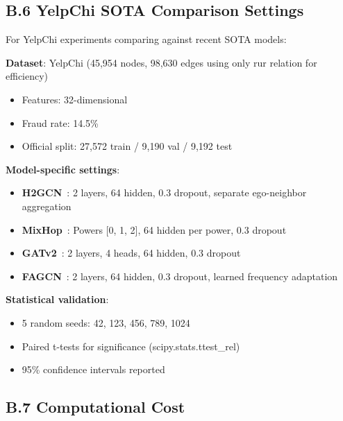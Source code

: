 \subsection*{B.6 YelpChi SOTA Comparison Settings}

For YelpChi experiments comparing against recent SOTA models:

\textbf{Dataset}: YelpChi (45,954 nodes, 98,630 edges using only rur relation for efficiency)
\begin{itemize}
\item Features: 32-dimensional
\item Fraud rate: 14.5\%
\item Official split: 27,572 train / 9,190 val / 9,192 test
\end{itemize}

\textbf{Model-specific settings}:
\begin{itemize}
\item \textbf{H2GCN}~\cite{zhu2020beyond}: 2 layers, 64 hidden, 0.3 dropout, separate ego-neighbor aggregation
\item \textbf{MixHop}~\cite{abu2019mixhop}: Powers [0, 1, 2], 64 hidden per power, 0.3 dropout
\item \textbf{GATv2}~\cite{brody2022gatv2}: 2 layers, 4 heads, 64 hidden, 0.3 dropout
\item \textbf{FAGCN}~\cite{bo2021beyond}: 2 layers, 64 hidden, 0.3 dropout, learned frequency adaptation
\end{itemize}

\textbf{Statistical validation}:
\begin{itemize}
\item 5 random seeds: 42, 123, 456, 789, 1024
\item Paired t-tests for significance (scipy.stats.ttest\_rel)
\item 95\% confidence intervals reported
\end{itemize}

\subsection*{B.7 Computational Cost}

